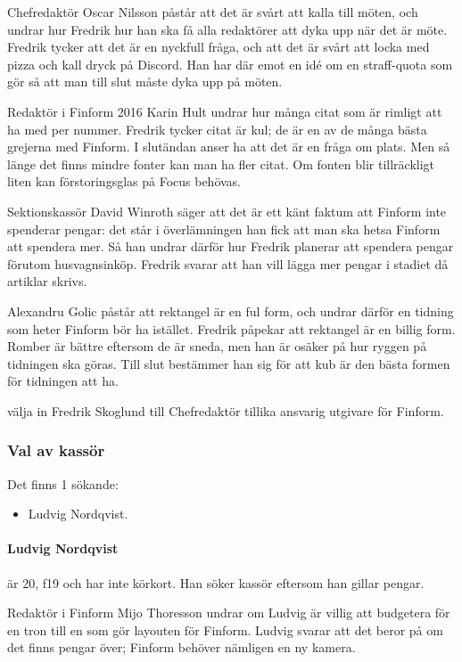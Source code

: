 \documentclass[hidelinks]{sektionsmote}
\begin{document}
Chefredaktör Oscar Nilsson påstår att det är svårt att kalla till möten, och undrar hur Fredrik hur han ska få alla redaktörer att dyka upp när det är möte.
Fredrik tycker att det är en nyckfull fråga, och att det är svårt att locka med pizza och kall dryck på Discord.
Han har där emot en idé om en straff-quota som gör så att man till slut måste dyka upp på möten.

Redaktör i Finform 2016 Karin Hult undrar hur många citat som är rimligt att ha med per nummer.
Fredrik tycker citat är kul; de är en av de många bästa grejerna med Finform.
I slutändan anser ha att det är en fråga om plats.
Men så länge det finns mindre fonter kan man ha fler citat.
Om fonten blir tillräckligt liten kan förstoringsglas på Focus behövas.

Sektionskassör David Winroth säger att det är ett känt faktum att Finform inte spenderar pengar: det står i överlämningen han fick att man ska hetsa Finform att spendera mer.
Så han undrar därför hur Fredrik planerar att spendera pengar förutom husvagnsinköp.
Fredrik svarar att han vill lägga mer pengar i stadiet då artiklar skrivs.

Alexandru Golic påstår att rektangel är en ful form, och undrar därför en tidning som heter Finform bör ha istället.
Fredrik påpekar att rektangel är en billig form.
Romber är bättre eftersom de är sneda, men han är osäker på hur ryggen på tidningen ska göras.
Till slut bestämmer han sig för att kub är den bästa formen för tidningen att ha.

\begin{beslut}
  \item välja in Fredrik Skoglund till Chefredaktör tillika ansvarig utgivare för Finform.
\end{beslut}


\subsubsection{Val av kassör}
Det finns 1 sökande:
\begin{itemize}
    \item Ludvig Nordqvist.
\end{itemize}

\paragraph{Ludvig Nordqvist} är 20, f19 och har inte körkort.
Han söker kassör eftersom han gillar pengar.

Redaktör i Finform Mijo Thoresson undrar om Ludvig är villig att budgetera för en tron till en som gör layouten för Finform.
Ludvig svarar att det beror på om det finns pengar över; Finform behöver nämligen en ny kamera.
\end{document}
